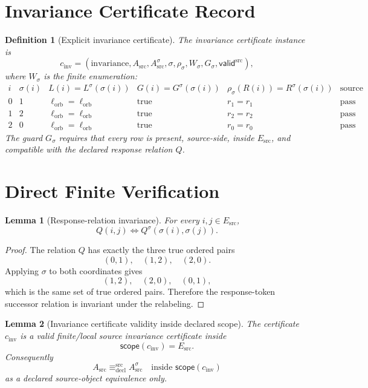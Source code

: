 \documentclass[11pt]{article}
\newcommand{\Esrc}{E_{\mathrm{src}}}
\newcommand{\Asrc}{A_{\mathrm{src}}}
\newcommand{\Asig}{A_{\mathrm{src}}^{\sigma}}
\newcommand{\Scope}{\mathsf{scope}}
\newcommand{\Valid}{\mathsf{valid}^{\mathrm{src}}}
\newcommand{\DeclEq}{\equiv_{\mathrm{decl}}^{\mathrm{src}}}
\newtheorem{definition}{Definition}
\newtheorem{lemma}{Lemma}
\begin{document}
\section{Invariance Certificate Record}

\begin{definition}[Explicit invariance certificate]
The invariance certificate instance is
\[
  c_{\mathrm{inv}}=
  (\mathrm{invariance},\Asrc,\Asig,\sigma,\rho_{\sigma},
  W_{\sigma},G_{\sigma},\Valid),
\]
where \(W_{\sigma}\) is the finite enumeration:
\[
\begin{array}{c|c|c|c|c|c}
i & \sigma(i) & L(i)=L^{\sigma}(\sigma(i)) &
G(i)=G^{\sigma}(\sigma(i)) &
\rho_{\sigma}(R(i))=R^{\sigma}(\sigma(i)) &
\text{source check}\\
\hline
0 & 1 & \ell_{\mathrm{orb}}=\ell_{\mathrm{orb}} &
\mathrm{true} & r_1=r_1 & \mathrm{pass}\\
1 & 2 & \ell_{\mathrm{orb}}=\ell_{\mathrm{orb}} &
\mathrm{true} & r_2=r_2 & \mathrm{pass}\\
2 & 0 & \ell_{\mathrm{orb}}=\ell_{\mathrm{orb}} &
\mathrm{true} & r_0=r_0 & \mathrm{pass}
\end{array}
\]
The guard \(G_{\sigma}\) requires that every row is present, source-side,
inside \(\Esrc\), and compatible with the declared response relation \(Q\).
\end{definition}

\section{Direct Finite Verification}

\begin{lemma}[Response-relation invariance]
For every \(i,j\in\Esrc\),
\[
  Q(i,j) \Longleftrightarrow Q^{\sigma}(\sigma(i),\sigma(j)).
\]
\end{lemma}

\begin{proof}
The relation \(Q\) has exactly the three true ordered pairs
\[
  (0,1),\quad (1,2),\quad (2,0).
\]
Applying \(\sigma\) to both coordinates gives
\[
  (1,2),\quad (2,0),\quad (0,1),
\]
which is the same set of true ordered pairs. Therefore the response-token
successor relation is invariant under the relabeling.
\end{proof}

\begin{lemma}[Invariance certificate validity inside declared scope]
The certificate \(c_{\mathrm{inv}}\) is a valid finite/local source invariance
certificate inside
\[
  \Scope(c_{\mathrm{inv}})=\Esrc.
\]
Consequently
\[
  \Asrc \DeclEq \Asig \quad\text{inside }\Scope(c_{\mathrm{inv}})
\]
as a declared source-object equivalence only.
\end{lemma}
\end{document}

